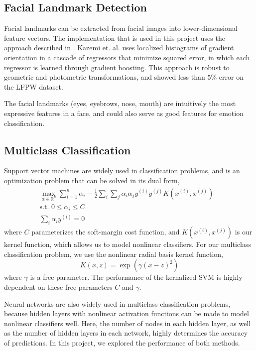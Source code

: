 \documentclass[10pt, twocolumn, twoside]{article}
\begin{document}
\subsection{Facial Landmark Detection}

Facial landmarks can be extracted from facial images into lower-dimensional feature
vectors. The implementation that is used in this project uses the approach described
in \cite{Kazemi}. Kazemi et. al. uses localized histograms of gradient orientation in
a cascade of regressors that minimize squared error, in which each regressor is learned
through gradient boosting. This approach is robust to geometric and photometric
transformations, and showed less than 5\% error on the LFPW dataset.

The facial landmarks (eyes, eyebrows, nose, mouth) are intuitively the most expressive 
features in a face, and could also serve as good features for emotion classification.

\subsection{Multiclass Classification}

Support vector machines are widely used in classification problems, and is an
optimization problem that can be solved in its dual form,
\begin{align*}
\label{softsvm}
\max_{\alpha \in \mathbb{R}^n} \sum_{i=1}^n \alpha_i - \frac{1}{2}\sum_i\sum_j
\alpha_i\alpha_j y^{(i)}y^{(j)}K(x^{(i)}, x^{(j)}) & \\
\text{s.t. } 0 \le \alpha_i \le C & \\
\sum_i \alpha_i y^{(i)} = 0 &
\end{align*}
where $C$ parameterizes the soft-margin cost function, and $K(x^{(i)}, x^{(j)})$
is our kernel function, which allows us to model nonlinear classifiers.
For our multiclass classification problem, we use the nonlinear radial basis
kernel function,
\begin{equation*}
K(x, z) = \exp{(\gamma(x - z)^2)}
\end{equation*}
where $\gamma$ is a free parameter. The performance of the kernalized SVM is
highly dependent on these free parameters $C$ and $\gamma$.

Neural networks are also widely used in multiclass classification problems,
because hidden layers with nonlinear activation functions can be made to model
nonlinear classifiers well. Here, the number of nodes in each hidden layer, as
well as the number of hidden layers in each network, highly determines the accuracy
of predictions. In this project, we explored the performance of both methods.
\end{document}
